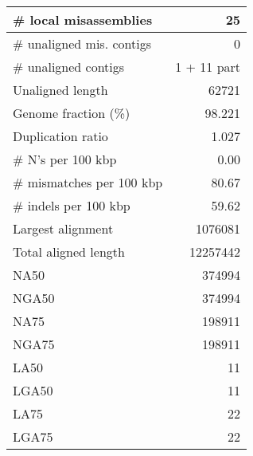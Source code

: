 \documentclass[12pt,a4paper]{article}
\begin{document}
\begin{table}[ht]
\begin{center}
\begin{tabular}{|l*{1}{|r}|}
\# local misassemblies & 25 \\ \hline
\# unaligned mis. contigs & 0 \\ \hline
\# unaligned contigs & 1 + 11 part \\ \hline
Unaligned length & 62721 \\ \hline
Genome fraction (\%) & 98.221 \\ \hline
Duplication ratio & 1.027 \\ \hline
\# N's per 100 kbp & 0.00 \\ \hline
\# mismatches per 100 kbp & 80.67 \\ \hline
\# indels per 100 kbp & 59.62 \\ \hline
Largest alignment & 1076081 \\ \hline
Total aligned length & 12257442 \\ \hline
NA50 & 374994 \\ \hline
NGA50 & 374994 \\ \hline
NA75 & 198911 \\ \hline
NGA75 & 198911 \\ \hline
LA50 & 11 \\ \hline
LGA50 & 11 \\ \hline
LA75 & 22 \\ \hline
LGA75 & 22 \\ \hline
\end{tabular}
\end{center}
\end{table}
\end{document}
